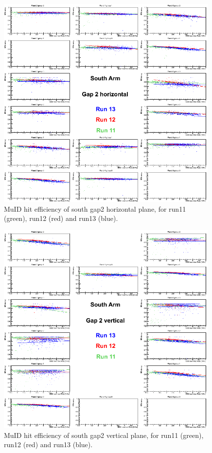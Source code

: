 \begin{figure}[h!]

  \centering
  \includegraphics[width=0.99\textwidth]{./figures/efficomp_South_gap2_horizontal.png}
  \caption{\label{Fig:efficiency:MuIdEff:a0g2p0}MuID hit efficiency of south gap2 horizontal plane, for run11 (green), run12 (red) and run13 (blue).}
\end{figure}
\clearpage


\begin{figure}[h!]

  \centering
  \includegraphics[width=0.99\textwidth]{./figures/efficomp_South_gap2_vertical.png}
  \caption{\label{Fig:efficiency:MuIdEff:a0g2p1}MuID hit efficiency of south gap2 vertical plane, for run11 (green), run12 (red) and run13 (blue).}
\end{figure}
\clearpage


